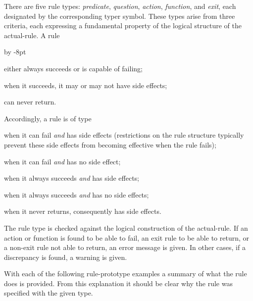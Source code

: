 \documentclass{article}
\newcommand\g[1]{{\color{blue!50!black}\sf #1}}
\renewenvironment{itemize}{\begin{list}{}{%
\advance\leftmargin by -8pt%
\setlength\itemsep{0ex plus 0.2ex}%
\setlength\partopsep{3pt}%
\setlength\topsep{2pt plus 2pt}%
\setlength\parsep{0pt plus 2pt}%
}}{\end{list}}
\renewcommand\/{\kern 0.066em}
\begin{document}
There are five rule types: \emph{predicate}, \emph{question}, \emph{action},
\emph{function}, and \emph{exit}, each designated by the corresponding
\g{typer} symbol. These types arise from three criteria, each expressing a
fundamental property of the logical structure of the \g{actual-rule}. A rule
\begin{itemize}
\item[a)] either always succeeds or is capable of failing;
\item[b)] when it succeeds, it may or may not have side effects;
\item[c)] can never return.
\end{itemize}
Accordingly, a rule is of type
\begin{list}{}{\setlength\topsep{2pt}%
\setlength\partopsep{3pt}%
\setlength{}%
\setlength{}%
\setlength{}%
\setlength\leftmargin{\parindent}}
\item[\emph{predicate}, ]
when it can fail \emph{and} has side effects (restrictions on the rule
structure typically prevent these side effects from becoming effective
when the rule fails);
\item[\emph{question}, ]
when it can fail \emph{and} has no side effect;
\item[\emph{action}, ]
when it always succeeds \emph{and} has side effects;
\item[\emph{function}, ]
when it always succeeds \emph{and} has no side effects;
\item[\emph{exit}, ]
when it never returns, consequently has side effects.
\end{list}
The rule type is checked against the logical construction of the
\g{actual-rule}. If an action or function is found to be able to fail, an
exit rule to be able to return, or a non-exit rule not able to return, an
error message is given. In other cases, if a discrepancy is found, a warning
is given.


With each of the following \g{rule-prototype} examples a summary of what the
rule does is provided. From this explanation it should be clear why the
rule was specified with the given type.
\end{document}
